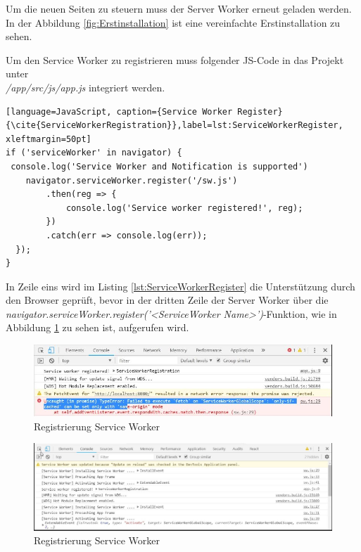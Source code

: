 Um die neuen Seiten zu steuern muss der Server Worker erneut geladen werden.
In der Abbildung \ref{fig:Erstinstallation} ist eine vereinfachte Erstinstallation zu sehen.


Um den Service Worker zu registrieren muss folgender \acs{JS}-Code in das Projekt unter \\ \textit{/app/src/js/app.js} integriert werden.
\begin{lstlisting}[language=JavaScript, caption={Service Worker Register} {\cite{ServiceWorkerRegistration}},label=lst:ServiceWorkerRegister, xleftmargin=50pt]
if ('serviceWorker' in navigator) {
 console.log('Service Worker and Notification is supported')
    navigator.serviceWorker.register('/sw.js')
        .then(reg => {
            console.log('Service worker registered!', reg);
        })
        .catch(err => console.log(err));
  });
}
\end{lstlisting}

In Zeile eins wird im Listing \ref{lst:ServiceWorkerRegister} die Unterstützung durch den Browser geprüft, bevor in der dritten Zeile der Server Worker über die\\ \textit{navigator.serviceWorker.register('<ServiceWorker Name>')}-Funktion, wie in Abbildung \ref{fig:RegistrierungSW} zu sehen ist, aufgerufen wird.
\begin{figure}[h]
	\centering
	\includegraphics[width=15cm]{BilderAllgemein/SW_Registred}\medskip
	\caption{Registrierung Service Worker}
	\label{fig:RegistrierungSW}
\end{figure}

\begin{figure}[h]
	\centering
	\includegraphics[width=15cm]{BilderAllgemein/SW_Activated}\medskip
	\caption{Registrierung Service Worker}
	\label{fig:Aktivierung}
\end{figure}


